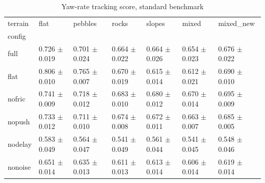 \begin{table}
\caption{Yaw-rate tracking score, standard benchmark}
\label{tab:tab_ang_base}
\begin{tabular}{lllllll}
\toprule
terrain & flat & pebbles & rocks & slopes & mixed & mixed_new \\
config &  &  &  &  &  &  \\
\midrule
full & 0.726 $\pm$ 0.019 & 0.701 $\pm$ 0.024 & 0.664 $\pm$ 0.022 & 0.664 $\pm$ 0.026 & 0.654 $\pm$ 0.023 & 0.676 $\pm$ 0.022 \\
flat & 0.806 $\pm$ 0.010 & 0.765 $\pm$ 0.007 & 0.670 $\pm$ 0.019 & 0.615 $\pm$ 0.014 & 0.612 $\pm$ 0.021 & 0.690 $\pm$ 0.010 \\
nofric & 0.741 $\pm$ 0.009 & 0.718 $\pm$ 0.012 & 0.683 $\pm$ 0.010 & 0.680 $\pm$ 0.012 & 0.670 $\pm$ 0.014 & 0.695 $\pm$ 0.009 \\
nopush & 0.733 $\pm$ 0.012 & 0.711 $\pm$ 0.010 & 0.674 $\pm$ 0.008 & 0.672 $\pm$ 0.011 & 0.663 $\pm$ 0.007 & 0.685 $\pm$ 0.005 \\
nodelay & 0.583 $\pm$ 0.049 & 0.564 $\pm$ 0.047 & 0.541 $\pm$ 0.049 & 0.561 $\pm$ 0.044 & 0.541 $\pm$ 0.045 & 0.548 $\pm$ 0.046 \\
nonoise & 0.651 $\pm$ 0.014 & 0.635 $\pm$ 0.013 & 0.611 $\pm$ 0.013 & 0.613 $\pm$ 0.014 & 0.606 $\pm$ 0.014 & 0.619 $\pm$ 0.014 \\
\bottomrule
\end{tabular}
\end{table}
